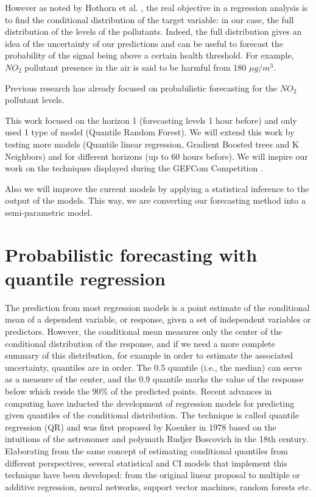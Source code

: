 \documentclass[a4paper,twocolumn,5p]{elsarticle}
\begin{document}
However as noted by Hothorn et al. \cite{hothorn_conditional_2014}, the real objective in a 
regression analysis is to find the conditional distribution of the target variable: in our 
case, the full distribution of the levels of the pollutants. Indeed, the full distribution 
gives an idea of the uncertainty of our predictions and can be useful to forecast the probability 
of the signal being above a certain health threshold. 
For example, $NO_2$ pollutant presence in the air is said to be harmful 
from 180 $\mu g / m^3$. 

Previous research \cite{proba_aznarte} has already focused on probabilistic forecasting
for the $NO_2$ pollutant levels.

This work focused on the horizon 1 (forecasting levels 1
hour before) and only used 1 type of model (Quantile Random Forest). We will 
extend this work by testing more models (Quantile linear regression, Gradient Boosted trees 
and K Neighbors) and for different horizons (up to 60 hours before). 
We will inspire our work on the techniques displayed during the GEFCom Competition 
\cite{mangalova_k-nearest_2016} \cite{hong_probabilistic_2016}.

Also we will improve the current models by applying a statistical inference to the output
of the models. This way, we are converting our forecasting method into a semi-parametric 
model.

\section{Probabilistic forecasting with quantile regression}
\label{sec:probForec}

The prediction from most regression models is a
point estimate of the conditional mean of a dependent variable, or
response, given a set of independent variables or predictors. However,
the conditional mean measures only the center of the conditional
distribution of the response, and if we need a more complete summary
of this distribution, for example in order to estimate the associated
uncertainty, quantiles are in order. The 0.5 quantile (i.e., the
median) can serve as a measure of the center, and the 0.9 quantile
marks the value of the response below which reside the 90\% of the
predicted points. Recent advances in computing have inducted the
development of regression models for predicting given quantiles of the
conditional distribution. The technique is called quantile regression
(QR) and was first proposed by Koenker in 1978
\cite{koenker_quantile_2001} based on the intuitions of the
astronomer and polymath Rudjer Boscovich in the 18th
century. Elaborating from the same concept of estimating conditional
quantiles from different perspectives, several statistical and CI
models that implement this technique have been developed: from the
original linear proposal to multiple or additive regression, neural
networks, support vector machines, random forests etc.
\end{document}
